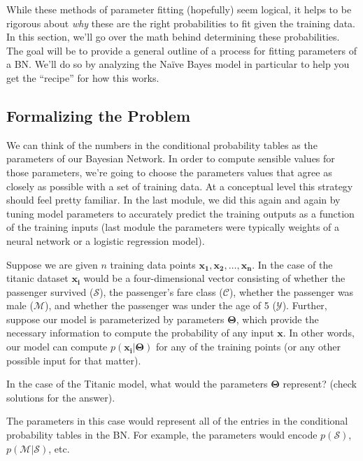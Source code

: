 \documentclass[assignment04_Solutions]{subfiles}
\begin{document}
While these methods of parameter fitting (hopefully) seem logical, it helps to be rigorous about \emph{why} these are the right probabilities to fit given the training data.  In this section, we'll go over the math behind determining these probabilities.  The goal will be to provide a general outline of a process for fitting parameters of a BN.  We'll do so by analyzing the Na\"ive Bayes model in particular to help you get the ``recipe'' for how this works.

\subsection{Formalizing the Problem}
We can think of the numbers in the conditional probability tables as the parameters of our Bayesian Network.  In order to compute sensible values for those parameters, we're going to choose the parameters values that agree as closely as possible with a set of training data.  At a conceptual level this strategy should feel pretty familiar.  In the last module, we did this again and again by tuning model parameters to accurately predict the training outputs as a function of the training inputs (last module the parameters were typically weights of a neural network or a logistic regression model).

Suppose we are given $n$ training data points $\mathbf{x_1}, \mathbf{x_2}, \ldots, \mathbf{x_n}$.  In the case of the titanic dataset $\mathbf{x_i}$ would be a four-dimensional vector consisting of whether the passenger survived ($\mathcal{S}$), the passenger's fare class ($\mathcal{C}$), whether the passenger was male ($\mathcal{M}$), and whether the passenger was under the age of 5 ($\mathcal{Y}$).  Further, suppose our model is parameterized by parameters $\mathbf{\Theta}$, which provide the necessary information to compute the probability of any input $\mathbf{x}$.  In other words, our model can compute $p(\mathbf{x_i} | \mathbf{\Theta})$ for any of the training points (or any other possible input for that matter).

\begin{understandingcheck}
In the case of the Titanic model, what would the parameters $\mathbf{\Theta}$ represent? (check solutions for the answer).
\begin{boxedsolution}
The parameters in this case would represent all of the entries in the conditional probability tables in the BN.  For example, the parameters would encode $p(\mathcal{S})$, $p(\mathcal{M}|\mathcal{S})$, etc.
\end{boxedsolution}
\end{understandingcheck}
\end{document}
